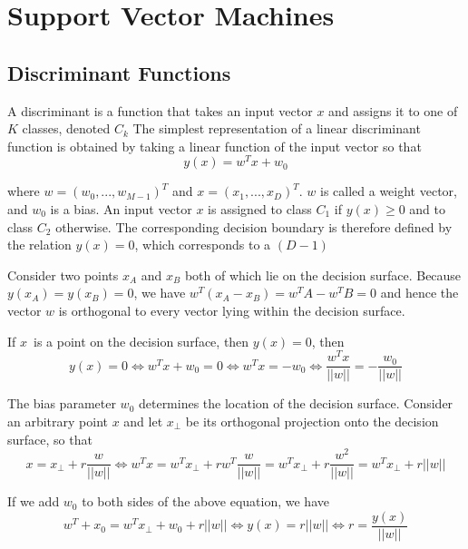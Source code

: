 \chapter{Support Vector Machines}

\section{Discriminant Functions}
A discriminant is a function that takes an input vector $x$ and assigns it to one of $K$ classes, denoted $C_k$
The simplest representation of a linear discriminant function is obtained by taking a linear function of the input vector so that
\begin{equation}
    \label{eq: discriminant classifier}
    y(x) = w^Tx + w_0    
\end{equation}

where $w=(w_0, ..., w_{M-1})^T$ and $x=(x_1, ..., x_D)^T$. $w$ is called a weight vector, and $w_0$ is a bias. An input vector $x$ is assigned to class $C_1$ if $y(x) \geq 0$ and to class $C_2$ otherwise. The corresponding decision boundary is therefore defined by the relation $y(x)=0$, which corresponds to a $(D-1)$

Consider two points $x_A$ and $x_B$ both of which lie on the decision surface. Because $y(x_A) = y(x_B) = 0$, we have $w^T(x_A - x_B)=w^TA - w^TB=0$ and hence the vector $w$ is orthogonal to every vector lying within the decision surface.

If $x$ is a point on the decision surface, then $y(x) = 0$, then
\begin{equation}
    y(x) = 0 \Leftrightarrow w^Tx + w_0 = 0 \Leftrightarrow w^Tx = -w_0 \Leftrightarrow \frac{w^Tx}{||w||} = - \frac{w_0}{||w||}
\end{equation}

The bias parameter $w_0$ determines the location of the decision surface.
Consider an arbitrary point $x$ and let $x_\bot$ be its orthogonal projection onto the decision surface, so that
\begin{equation}
    x = x_\bot + r \frac{w}{||w||} \Leftrightarrow w^T x = w^Tx_\bot + r w^T \frac{w}{||w||} = w^Tx_\bot + r\frac{w^2}{||w||} = w^Tx_\bot + r||w||
\end{equation}

If we add $w_0$ to both sides of the above equation, we have
\begin{equation}
    w^T + x_0 = w^Tx_\bot + w_0 + r||w|| \Leftrightarrow y(x) = r||w|| \Leftrightarrow r = \frac{y(x)}{||w||}
\end{equation}

